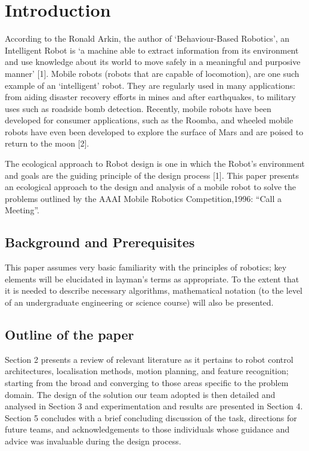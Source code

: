 \documentclass{article}
\begin{document}
    \section{Introduction}
	According to the Ronald Arkin, the author of ‘Behaviour-Based Robotics’, an Intelligent Robot is ‘a machine able to extract information from its environment and use knowledge about its world to move safely in a meaningful and purposive manner’ [1]. Mobile robots (robots that are capable of locomotion), are one such example of an ‘intelligent’ robot. They are regularly used in many applications: from aiding disaster recovery efforts in mines and after earthquakes, to military uses such as roadside bomb detection. Recently, mobile robots have been developed for consumer applications, such as the Roomba, and wheeled mobile robots have even been developed to explore the surface of Mars and are poised to return to the moon [2].

	The ecological approach to Robot design is one in which the Robot’s environment and goals are the guiding principle of the design process [1]. This paper presents an ecological approach to the design and analysis of a mobile robot to solve the problems outlined by the AAAI Mobile Robotics Competition,1996: “Call a Meeting”.

	\subsection{Background and Prerequisites}
	This paper assumes very basic familiarity with the principles of robotics; key elements will be elucidated in layman’s terms as appropriate. To the extent that it is needed to describe necessary algorithms, mathematical notation (to the level of an undergraduate engineering or science course) will also be presented.

	\subsection{Outline of the paper}
	Section 2 presents a review of relevant literature as it pertains to robot control architectures, localisation methods, motion planning, and feature recognition; starting from the broad and converging to those areas specific to the problem domain. The design of the solution our team adopted is then detailed and analysed in Section 3 and experimentation and results are presented in Section 4. Section 5 concludes with a brief concluding discussion of the task, directions for future teams, and acknowledgements to those individuals whose guidance and advice was invaluable during the design process.
\end{document}
